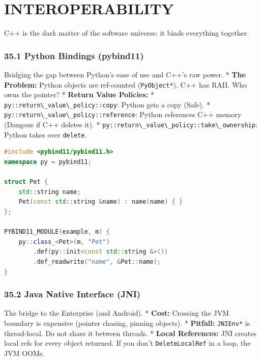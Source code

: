 \hypertarget{interoperability}{%
\chapter{INTEROPERABILITY}\label{interoperability}}

C++ is the dark matter of the software universe: it binds everything
together.

\hypertarget{python-bindings-pybind11}{%
\subsection{35.1 Python Bindings
(pybind11)}\label{python-bindings-pybind11}}

Bridging the gap between Python's ease of use and C++'s raw power. *
\textbf{The Problem:} Python objects are ref-counted
(\passthrough{\lstinline!PyObject*!}). C++ has RAII. Who owns the
pointer? * \textbf{Return Value Policies:} *
\passthrough{\lstinline!py::return\_value\_policy::copy!}: Python gets a
copy (Safe). *
\passthrough{\lstinline!py::return\_value\_policy::reference!}: Python
references C++ memory (Dangous if C++ deletes it). *
\passthrough{\lstinline!py::return\_value\_policy::take\_ownership!}:
Python takes over \passthrough{\lstinline!delete!}.

\begin{lstlisting}[language={C++}]
#include <pybind11/pybind11.h>
namespace py = pybind11;

struct Pet {
    std::string name;
    Pet(const std::string &name) : name(name) { }
};

PYBIND11_MODULE(example, m) {
    py::class_<Pet>(m, "Pet")
        .def(py::init<const std::string &>())
        .def_readwrite("name", &Pet::name);
}
\end{lstlisting}

\hypertarget{java-native-interface-jni}{%
\subsection{35.2 Java Native Interface
(JNI)}\label{java-native-interface-jni}}

The bridge to the Enterprise (and Android). * \textbf{Cost:} Crossing
the JVM boundary is expensive (pointer chasing, pinning objects). *
\textbf{Pitfall:} \passthrough{\lstinline!JNIEnv*!} is thread-local. Do
not share it between threads. * \textbf{Local References:} JNI creates
local refs for every object returned. If you don't
\passthrough{\lstinline!DeleteLocalRef!} in a loop, the JVM OOMs.

